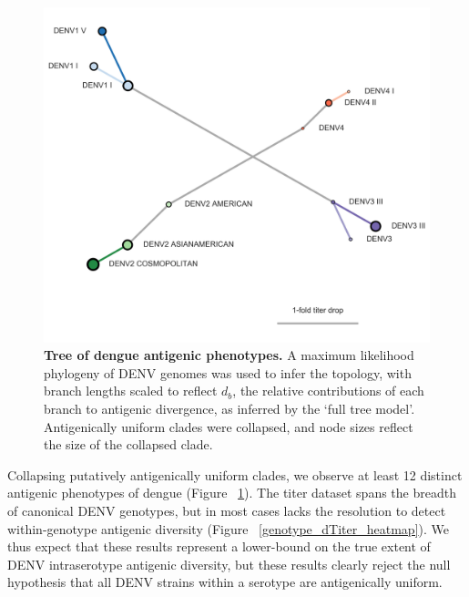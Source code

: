 \documentclass[11pt,oneside,letterpaper]{article}
\begin{document}
\begin{figure}[h]
  \begin{centering}
    \includegraphics[width=.8\linewidth]{../figures/png/antigenic_tree.png}
    \caption{\textbf{Tree of dengue antigenic phenotypes.}  A maximum likelihood phylogeny of DENV genomes was used to infer the topology, with branch lengths scaled to reflect $d_b$, the relative contributions of each branch to antigenic divergence, as inferred by the `full tree model'. Antigenically uniform clades were collapsed, and node sizes reflect the size of the collapsed clade.}
     \label{antigenic_tree}
  \end{centering}
\end{figure}

Collapsing putatively antigenically uniform clades, we observe at least 12 distinct antigenic phenotypes of dengue (Figure ~\ref{antigenic_tree}).
The titer dataset spans the breadth of canonical DENV genotypes, but in most cases lacks the resolution to detect within-genotype antigenic diversity (Figure ~\ref{genotype_dTiter_heatmap}).
We thus expect that these results represent a lower-bound on the true extent of DENV intraserotype antigenic diversity, but these results clearly reject the null hypothesis that all DENV strains within a serotype are antigenically uniform.
\end{document}
